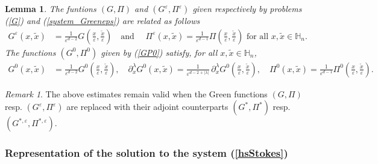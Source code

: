 \documentclass[11pt, reqno]{amsart}
\newtheorem{lemma}[theorem]{Lemma}
\theoremstyle{definition}
\theoremstyle{remark}
\newtheorem{remark}[theorem]{Remark}
\numberwithin{equation}{section}
\begin{document}
	
	
	\begin{lemma}\label{rescaled_GP}
		The funtions $(G,\Pi)$ and $(G^{\varepsilon},\Pi^{\varepsilon} )$ given respectively by problems \textup{(\ref{G})} and \textup{(\ref{system_Greeneps})} are related as follows
		\begin{align*}
			G^{\varepsilon} (x,\tilde{x})&= \frac{1}{\varepsilon^{d-2}} G\left( \frac{x}{\varepsilon}, \frac{\tilde{x}}{\varepsilon}\right)\quad \mbox{and }\quad 	\Pi^{\varepsilon} (x,\tilde{x})=  \frac{1}{\varepsilon^{d-1}} \Pi\left( \frac{x}{\varepsilon}, \frac{\tilde{x}}{\varepsilon}\right) \mbox{ for all } x,\tilde{x}\in\mathbb{H}_n .
		\end{align*}
	The functions $(G^0,\Pi^0)$ given by \textup{(\ref{GP0})} satisfy, for all $x,\tilde{x}\in\mathbb{H}_n$,
		\begin{align*}
			G^{0}(x,\tilde{x})&=  \frac{1}{\varepsilon^{d-2}}G^{0}\left( \frac{x}{\varepsilon}, \frac{\tilde{x}}{\varepsilon}\right),\quad
			\partial^\lambda_{\!x} G^{0}(x,\tilde{x})=  \frac{1}{\varepsilon^{d-2+|\lambda|}} \, \partial^\lambda_{\!x} G^{0}\left( \frac{x}{\varepsilon}, \frac{\tilde{x}}{\varepsilon}\right),\quad 
			\Pi^{0}(x,\tilde{x})= \frac{1}{\varepsilon^{d-1}} \Pi^{0}\left( \frac{x}{\varepsilon}, \frac{\tilde{x}}{\varepsilon}\right).
		\end{align*}
		
	\end{lemma}
	
	\begin{remark} The above estimates remain valid when the Green functions  $(G,\Pi)$ resp. $(G^{\varepsilon},\Pi^{\varepsilon})$ are replaced with their adjoint counterparts $(G^*,\Pi^*)$ resp. $(G^{*,\varepsilon},\Pi^{*,\varepsilon})$.
	\end{remark}
	
	\subsubsection{Representation of the solution to the system \textup{(\ref{hsStokes})}}
	
\end{document}
